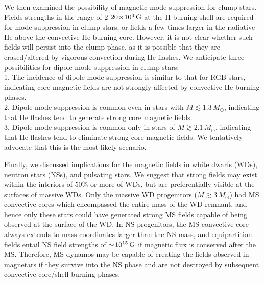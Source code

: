 We then examined the possibility of magnetic mode suppression for clump stars. Fields strengths in the range of $2$-$20 \! \times \! 10^4 \, {\rm G}$ at the H-burning shell are required for mode suppression in clump stars, or fields a few times larger in the radiative He above the convective He-burning core. However, it is not clear whether such fields will persist into the clump phase, as it is possible that they are erased/altered by vigorous convection during He flashes. We anticipate three possibilities for dipole mode suppression in clump stars:\\
1. The incidence of dipole mode suppression is similar to that for RGB stars, indicating core magnetic fields are not strongly affected by convective He burning phases. \\
2. Dipole mode suppression is common even in stars with $M \lesssim 1.3 \, M_\odot$, indicating that He flashes tend to generate strong core magnetic fields. \\
3. Dipole mode suppression is common only in stars of $M \gtrsim 2.1 \, M_\odot$, indicating that He flashes tend to eliminate strong core magnetic fields. We tentatively advocate that this is the most likely scenario. 



Finally, we discussed implications for the magnetic fields in white dwarfs (WDs), neutron stars (NSs), and pulsating stars. We suggest that strong fields may exist within the interiors of $50 \%$ or more of WDs, but are preferentially visible at the surfaces of massive WDs. Only the massive WD progenitors ($M \gtrsim 3 \, M_\odot$) had MS convective cores which encompassed the entire mass of the WD remnant, and hence only these stars could have generated strong MS fields capable of being observed at the surface of the WD. In NS progenitors, the MS convective core always extends to mass coordinates larger than the NS mass, and equipartition fields entail NS field strengths of $\sim \! 10^{15} \, {\rm G}$ if magnetic flux is conserved after the MS. Therefore, MS dynamos may be capable of creating the fields observed in magnetars if they survive into the NS phase and are not destroyed by subsequent convective core/shell burning phases. 
  
  
  
  
  
  
  
  
  
  
  